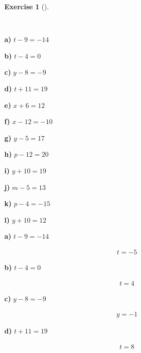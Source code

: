 \documentclass[
  letterpaper,
  DIV=11,
  numbers=noendperiod]{scrreprt}
\theoremstyle{definition}
\newtheorem{exercise}{Exercise}[chapter]
\theoremstyle{remark}
\begin{document}
\begin{exercise}[]\protect\hypertarget{exr-u5-1}{}\label{exr-u5-1}

~

\textbf{a)} \(\displaystyle t - 9 = -14\)

\textbf{b)} \(\displaystyle t - 4 = 0\)

\textbf{c)} \(\displaystyle y - 8 = -9\)

\textbf{d)} \(\displaystyle t + 11 = 19\)

\textbf{e)} \(\displaystyle x + 6 = 12\)

\textbf{f)} \(\displaystyle x - 12 = -10\)

\textbf{g)} \(\displaystyle y - 5 = 17\)

\textbf{h)} \(\displaystyle p - 12 = 20\)

\textbf{i)} \(\displaystyle y + 10 = 19\)

\textbf{j)} \(\displaystyle m - 5 = 13\)

\textbf{k)} \(\displaystyle p - 4 = -15\)

\textbf{l)} \(\displaystyle y + 10 = 12\)

\begin{tcolorbox}[enhanced jigsaw, opacitybacktitle=0.6, coltitle=black, arc=.35mm, colframe=quarto-callout-tip-color-frame, colback=white, bottomrule=.15mm, left=2mm, colbacktitle=quarto-callout-tip-color!10!white, titlerule=0mm, opacityback=0, title=\textcolor{quarto-callout-tip-color}{\faLightbulb}\hspace{0.5em}{🔍 View Solutions}, leftrule=.75mm, breakable, rightrule=.15mm, bottomtitle=1mm, toptitle=1mm, toprule=.15mm]

\textbf{a)} \(\displaystyle t - 9 = -14\)

\begin{align*}
t = -5
\end{align*}

\textbf{b)} \(\displaystyle t - 4 = 0\)

\begin{align*}
t = 4
\end{align*}

\textbf{c)} \(\displaystyle y - 8 = -9\)

\begin{align*}
y = -1
\end{align*}

\textbf{d)} \(\displaystyle t + 11 = 19\)

\begin{align*}
t = 8
\end{align*}


\end{tcolorbox}
\end{exercise}
\end{document}
